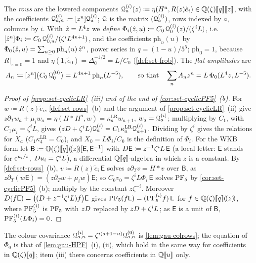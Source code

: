 \begin{defn}
The \emph{rows} are the lowered components $\mathcal{Q}^{(i)}_a(z)\coloneqq\eta(H^a,R(z)\tilde e_i)\in\mathbb{Q}(\zeta)[\![ q ]\!][\![ z ]\!]$, with the coefficients $\mathcal{Q}^{(i)}_{a,n}\coloneqq[z^n]\mathcal{Q}^{(i)}_a$; $\mathcal{Q}$ is the matrix $(\mathcal{Q}^{(i)}_a)$, rows indexed by $a$, columns by $i$. With $\hat{z}=L^4z$ we \emph{define} $\Phi_i(\hat{z},u)\coloneqq C_0\,\mathcal{Q}^{(i)}_0(z)/(\zeta^iL)$, i.e.\ $[\hat{z}^n]\Phi_i\coloneqq C_0\,\mathcal{Q}^{(i)}_{0,n}/(\zeta^iL^{4n+1})$, and the coefficients $\mathrm{ph}_n(u)$ by $\Phi_0(\hat{z},u)=\sum_{n\geq0}\mathrm{ph}_n(u)\,\hat{z}^n$, power series in $q=(1-u)/5^5$; $\mathrm{ph}_0=1$, because $R|_{z=0}=1$ and $\eta(1,\tilde e_0)=\Delta_0^{-1/2}=L/C_0$ (\cref{def:set-frob}). The \emph{flat amplitudes} are
\[
A_n\coloneqq[z^n]\bigl(C_0\,\mathcal{Q}^{(0)}_0\bigr)=L^{4n+1}\,\mathrm{ph}_n(L^{-5}),\qquad\text{so that}\quad\sum_nA_nz^n=L\,\Phi_0(L^4z,L^{-5}).
\]
\end{defn}

\begin{proof}[Proof of \cref{prop:set-cyclicLR}~(iii) and of the end of \cref{cor:set-cyclicPF5}~(b)]
For $w\coloneqq R(z)\tilde e_i$, \cref{def:set-rows}~(b) and the argument of \cref{prop:set-cyclicLR}~(ii) give $z\partial_Tw_a+\mu_iw_a=\eta(H*H^a,w)=\kappa^{\mathrm{LR}}_aw_{a+1}$, $w_a=\mathcal{Q}^{(i)}_a$; multiplying by $C_1$, with $C_1\mu_i=\zeta^iL$, gives $(zD+\zeta^iL)\mathcal{Q}^{(i)}_a=C_1\kappa^{\mathrm{LR}}_a\mathcal{Q}^{(i)}_{a+1}$. Dividing by $\zeta^i$ gives the relations for $X_a$ ($C_1\kappa^{\mathrm{LR}}_4=C_0$), and $X_0=L\Phi_i/C_0$ is the definition of $\Phi_i$. For the WKB form let $\mathsf B\coloneqq\mathbb{Q}(\zeta)[\![ q ]\!](\!(z)\!)[\mathsf E,\mathsf E^{-1}]$ with $D\mathsf E\coloneqq z^{-1}\zeta^iL\,\mathsf E$ (a local letter: $\mathsf E$ stands for $\mathrm{e}^{u_i/z}$, $D u_i=\zeta^iL$), a differential $\mathbb{Q}[\![ q ]\!]$-algebra in which $z$ is a constant. By \cref{def:set-rows}~(b), $v\coloneqq R(z)\tilde e_i\,\mathsf E$ solves $z\partial_Tv=H*v$ over $\mathsf B$, as $z\partial_T(w\mathsf E)=(z\partial_Tw+\mu_iw)\mathsf E$; so $C_0v_0=\zeta^iL\Phi_i\,\mathsf E$ solves $\mathrm{PF}_{5}$ by \cref{cor:set-cyclicPF5}~(b); multiply by the constant $z\zeta^{-i}$. Moreover $D(f\mathsf E)=\bigl((D+z^{-1}\zeta^iL)f\bigr)\mathsf E$ gives $\mathrm{PF}_{5}(f\mathsf E)=(\mathrm{PF}_{5}^{(i)}f)\,\mathsf E$ for $f\in\mathbb{Q}(\zeta)[\![ q ]\!](\!(z)\!)$, where $\mathrm{PF}_{5}^{(i)}$ is $\mathrm{PF}_{5}$ with $zD$ replaced by $zD+\zeta^iL$; as $\mathsf E$ is a unit of $\mathsf B$, $\mathrm{PF}_{5}^{(i)}(L\Phi_i)=0$.
\end{proof}

The colour covariance $\mathcal{Q}^{(i)}_{a,n}=\zeta^{i(a+1-n)}\mathcal{Q}^{(0)}_{a,n}$ is \cref{lem:gau-colrows}; the equation of $\Phi_0$ is that of \cref{lem:gau-HPF}~(i), (ii), which hold in the same way for coefficients in $\mathbb{Q}(\zeta)[\![ q ]\!]$; item (iii) there concerns coefficients in $\mathbb{Q}[\![ u ]\!]$ only.

